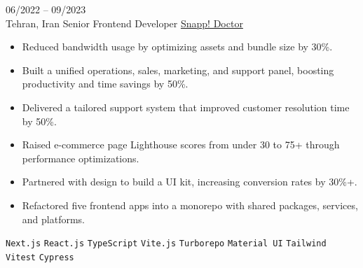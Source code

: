 \entry
{06/2022 -- 09/2023 \\ Tehran, Iran}
{Senior Frontend Developer}
{\href{https://snapp.doctor/}{Snapp! Doctor}}
{\vspace{-10pt}
    \begin{itemize}[noitemsep,topsep=0pt,parsep=0pt,partopsep=0pt, leftmargin=-1pt]
        \item Reduced bandwidth usage by optimizing assets and bundle size by 30\%.
        \item Built a unified operations, sales, marketing, and support panel, boosting productivity and time savings by 50\%.
        \item Delivered a tailored support system that improved customer resolution time by 50\%.
        \item Raised e-commerce page Lighthouse scores from under 30 to 75+ through performance optimizations.
        \item Partnered with design to build a UI kit, increasing conversion rates by 30\%+.
        \item Refactored five frontend apps into a monorepo with shared packages, services, and platforms.
    \end{itemize}
    \texttt{Next.js} \slashsep \texttt{React.js} \slashsep \texttt{TypeScript} \slashsep \texttt{Vite.js} \slashsep \texttt{Turborepo} \slashsep \texttt{Material UI} \slashsep \texttt{Tailwind} \slashsep \texttt{Vitest} \slashsep \texttt{Cypress}
}
